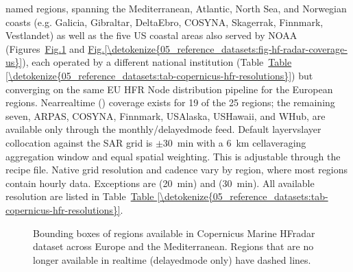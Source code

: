 \documentclass[a4paper,10pt,english]{sphinxmanual}
\begin{document}
\sphinxAtStartPar
{}

 named regions, spanning the Mediterranean, Atlantic, North Sea, and Norwegian coasts (e.g. Galicia, Gibraltar, DeltaEbro, COSYNA, Skagerrak, Finnmark, Vestlandet) as well as the five US coastal areas also served by NOAA (Figures \hyperref[\detokenize{05_reference_datasets:fig-hf-radar-coverage-europe}]{Fig.\@ \ref{\detokenize{05_reference_datasets:fig-hf-radar-coverage-europe}}} and \hyperref[\detokenize{05_reference_datasets:fig-hf-radar-coverage-us}]{Fig.\@ \ref{\detokenize{05_reference_datasets:fig-hf-radar-coverage-us}}}), each operated by a different national institution (Table \hyperref[\detokenize{05_reference_datasets:tab-copernicus-hfr-resolutions}]{Table \ref{\detokenize{05_reference_datasets:tab-copernicus-hfr-resolutions}}}) but converging on the same EU HFR Node distribution pipeline for the European regions. Near\sphinxhyphen{}real\sphinxhyphen{}time () coverage exists for 19 of the 25 regions; the remaining seven, ARPAS, COSYNA, Finnmark, US\sphinxhyphen{}Alaska, US\sphinxhyphen{}Hawaii, and WHub, are available only through the monthly/delayed\sphinxhyphen{}mode feed. Default layer\sphinxhyphen{}vs\sphinxhyphen{}layer collocation against the SAR grid is \(\pm\)30 min with a 6 km cell\sphinxhyphen{}averaging aggregation window and equal spatial weighting. This is adjustable through the  recipe file. Native grid resolution and cadence vary by region, where most regions contain hourly data. Exceptions are  (20 min) and  (30 min). All available resolution are listed in Table \hyperref[\detokenize{05_reference_datasets:tab-copernicus-hfr-resolutions}]{Table \ref{\detokenize{05_reference_datasets:tab-copernicus-hfr-resolutions}}}.

\begin{figure}[htbp]
\centering
\capstart

\noindent{}
\caption{Bounding boxes of regions available in Copernicus Marine HF\sphinxhyphen{}radar dataset across Europe and the Mediterranean. Regions that are no longer available in real\sphinxhyphen{}time (delayed\sphinxhyphen{}mode only) have dashed lines.}\label{\detokenize{05_reference_datasets:fig-hf-radar-coverage-europe}}\end{figure}
\end{document}
